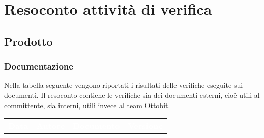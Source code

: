 \section{Resoconto attività di verifica}
\subsection{Prodotto}
\subsubsection{Documentazione}
Nella tabella seguente vengono riportati i risultati delle verifiche eseguite sui documenti. Il resoconto contiene le verifiche sia dei documenti esterni, cioè utili al committente, sia interni, utili invece al team Ottobit.\\
\begin{longtable}{p{3cm} p{4cm} p{5cm} p{2cm}}
	\rowcolor{LightBlue}
		  \textbf{\textcolor{white}{Data}}
		& \textbf{\textcolor{white}{Autore}}
		& \textbf{\textcolor{white}{Documento}} 
		& \textbf{\textcolor{white}{Versione}}\\


\end{longtable}
